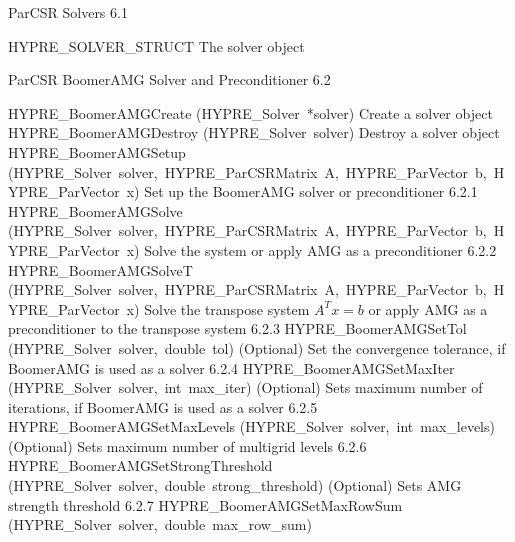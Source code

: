 \documentclass{article}
\begin{document}
\begin{cxxentry}
\begin{cxxdoc}
\end{cxxdoc}
\begin{cxxentry}
{}
        {ParCSR Solvers}
        {}
        {
}
        {6.1}
\begin{cxxnames}
        {HYPRE\_SOLVER\_STRUCT}
        {}
        {
The solver object}
        {}
\label{cxx.6.1.1}
\end{cxxnames}
\end{cxxentry}
\begin{cxxentry}
{}
        {ParCSR BoomerAMG Solver and Preconditioner}
        {}
        {
}
        {6.2}
\begin{cxxnames}
        {HYPRE\_BoomerAMGCreate}
        {(HYPRE\_Solver\ *solver)}
        {
Create a solver object}
        {}
\label{cxx.6.2.55}
        {HYPRE\_BoomerAMGDestroy}
        {(HYPRE\_Solver\ solver)}
        {
Destroy a solver object}
        {}
\label{cxx.6.2.56}
        {HYPRE\_BoomerAMGSetup}
        {(HYPRE\_Solver\ solver,\ HYPRE\_ParCSRMatrix\ A,\ HYPRE\_ParVector\ b,\ HYPRE\_ParVector\ x)}
        {
Set up the BoomerAMG solver or preconditioner}
        {6.2.1}
        {HYPRE\_BoomerAMGSolve}
        {(HYPRE\_Solver\ solver,\ HYPRE\_ParCSRMatrix\ A,\ HYPRE\_ParVector\ b,\ HYPRE\_ParVector\ x)}
        {
Solve the system or apply AMG as a preconditioner}
        {6.2.2}
        {HYPRE\_BoomerAMGSolveT}
        {(HYPRE\_Solver\ solver,\ HYPRE\_ParCSRMatrix\ A,\ HYPRE\_ParVector\ b,\ HYPRE\_ParVector\ x)}
        {
Solve the transpose system $A^T x = b$ or apply AMG as a preconditioner
to the transpose system }
        {6.2.3}
        {HYPRE\_BoomerAMGSetTol}
        {(HYPRE\_Solver\ solver,\ double\ tol)}
        {
(Optional) Set the convergence tolerance, if BoomerAMG is used
as a solver}
        {6.2.4}
        {HYPRE\_BoomerAMGSetMaxIter}
        {(HYPRE\_Solver\ solver,\ int\ max\_iter)}
        {
(Optional) Sets maximum number of iterations, if BoomerAMG is used
as a solver}
        {6.2.5}
        {HYPRE\_BoomerAMGSetMaxLevels}
        {(HYPRE\_Solver\ solver,\ int\ max\_levels)}
        {
(Optional) Sets maximum number of multigrid levels}
        {6.2.6}
        {HYPRE\_BoomerAMGSetStrongThreshold}
        {(HYPRE\_Solver\ solver,\ double\ strong\_threshold)}
        {
(Optional) Sets AMG strength threshold}
        {6.2.7}
        {HYPRE\_BoomerAMGSetMaxRowSum}
        {(HYPRE\_Solver\ solver,\ double\ max\_row\_sum)}
        {
}
\end{cxxnames}
\end{cxxentry}
\end{cxxentry}
\end{document}
